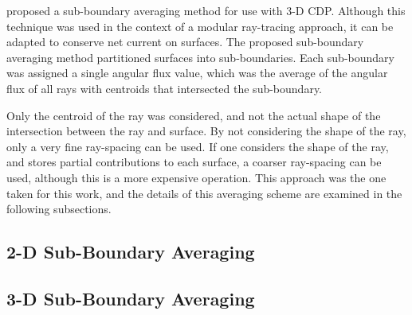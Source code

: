 {{      \citet{Liu2014} proposed a sub-boundary averaging method for use with 3-D \ac{CDP}.
      Although this technique was used in the context of a modular ray-tracing approach, it can be adapted to conserve net current on surfaces.
      The proposed sub-boundary averaging method partitioned surfaces into sub-boundaries.
      Each sub-boundary was assigned a single angular flux value, which was the average of the angular flux of all rays with centroids that intersected the sub-boundary.

      Only the centroid of the ray was considered, and not the actual shape of the intersection between the ray and surface.
      By not considering the shape of the ray, only a very fine ray-spacing can be used.
      If one considers the shape of the ray, and stores partial contributions to each surface, a coarser ray-spacing can be used, although this is a more expensive operation.
      This approach was the one taken for this work, and the details of this averaging scheme are examined in the following subsections.

      \subsection{2-D Sub-Boundary Averaging}{\label{ssec:RT:2-D Sub-Boundary Averaging}
        \blindtext[4]
      }
      \subsection{3-D Sub-Boundary Averaging}{\label{ssec:3-D Sub-Boundary Averaging}
        \blindtext[8]
      }
    }

    \printbibliography
}